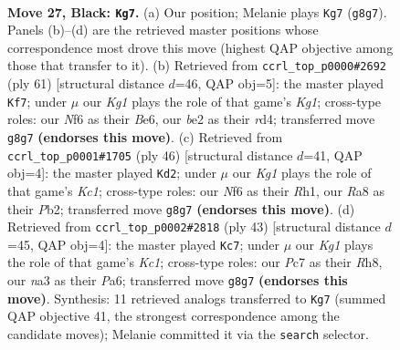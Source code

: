 \documentclass[11pt]{article}
\begin{document}
\clearpage

\begin{figure}[p]\centering
\begin{subfigure}{0.46\textwidth}\centering
\resizebox{\linewidth}{!}{%
\newchessgame
\chessboard[
  setfen={r5k1/pbpp4/1p3n1p/5p2/2P2P2/NP6/P2PBK1P/R7 b - - 0 27},
  showmover=false,
  pgfstyle=straightmove, color=movearrow, markmove={g8-g7}
]}
\caption{}
\end{subfigure}\hfill
\begin{subfigure}{0.46\textwidth}\centering
\resizebox{\linewidth}{!}{%
\newchessgame
\chessboard[
  setfen={2r3k1/1p2p2p/p3b1p1/4P3/3R4/P4P2/1P1B2PP/6K1 b - - 3 31},
  showmover=false,
  pgfstyle=straightmove, color=movearrow, markmove={g8-f7}
]}
\caption{}
\end{subfigure}
\\[4pt]
\begin{subfigure}{0.46\textwidth}\centering
\resizebox{\linewidth}{!}{%
\newchessgame
\chessboard[
  setfen={r5k1/pp4pp/2p1p1n1/8/P2P2P1/6BP/1P3P2/2K4R w - - 0 24},
  showmover=false,
  pgfstyle=straightmove, color=movearrow, markmove={c1-d2}
]}
\caption{}
\end{subfigure}\hfill
\begin{subfigure}{0.46\textwidth}\centering
\resizebox{\linewidth}{!}{%
\newchessgame
\chessboard[
  setfen={2k2b1r/1p2np2/p3pp2/7p/4BP1P/1N6/PPP2KP1/3R4 b - - 0 22},
  showmover=false,
  pgfstyle=straightmove, color=movearrow, markmove={c8-c7}
]}
\caption{}
\end{subfigure}
\caption{\textbf{Move 27, Black: \texttt{Kg7}.} (a) Our position; Melanie plays \texttt{Kg7} (\texttt{g8g7}). Panels (b)--(d) are the retrieved master positions whose correspondence most drove this move (highest QAP objective among those that transfer to it). (b) Retrieved from \texttt{ccrl\_top\_p0000\#2692} (ply 61) [structural distance $d$=46, QAP obj=5]: the master played \texttt{Kf7}; under $\mu$ our \emph{Kg1} plays the role of that game's \emph{Kg1}; cross-type roles: our \emph{N}f6 as their \emph{B}e6, our \emph{b}e2 as their \emph{r}d4; transferred move \texttt{g8g7} \textbf{(endorses this move)}. (c) Retrieved from \texttt{ccrl\_top\_p0001\#1705} (ply 46) [structural distance $d$=41, QAP obj=4]: the master played \texttt{Kd2}; under $\mu$ our \emph{Kg1} plays the role of that game's \emph{Kc1}; cross-type roles: our \emph{N}f6 as their \emph{R}h1, our \emph{R}a8 as their \emph{P}b2; transferred move \texttt{g8g7} \textbf{(endorses this move)}. (d) Retrieved from \texttt{ccrl\_top\_p0002\#2818} (ply 43) [structural distance $d$=45, QAP obj=4]: the master played \texttt{Kc7}; under $\mu$ our \emph{Kg1} plays the role of that game's \emph{Kc1}; cross-type roles: our \emph{P}c7 as their \emph{R}h8, our \emph{n}a3 as their \emph{P}a6; transferred move \texttt{g8g7} \textbf{(endorses this move)}. Synthesis: 11 retrieved analogs transferred to \texttt{Kg7} (summed QAP objective 41, the strongest correspondence among the candidate moves); Melanie committed it via the \texttt{search} selector.}
\label{fig:thought-m53}
\end{figure}
\end{document}
